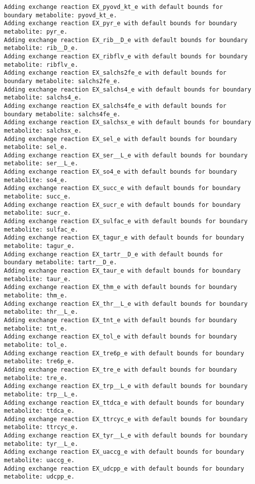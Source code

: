 \documentclass[
  letterpaper,
  DIV=11,
  numbers=noendperiod]{scrartcl}
\begin{document}
\begin{verbatim}
Adding exchange reaction EX_pyovd_kt_e with default bounds for boundary metabolite: pyovd_kt_e.
Adding exchange reaction EX_pyr_e with default bounds for boundary metabolite: pyr_e.
Adding exchange reaction EX_rib__D_e with default bounds for boundary metabolite: rib__D_e.
Adding exchange reaction EX_ribflv_e with default bounds for boundary metabolite: ribflv_e.
Adding exchange reaction EX_salchs2fe_e with default bounds for boundary metabolite: salchs2fe_e.
Adding exchange reaction EX_salchs4_e with default bounds for boundary metabolite: salchs4_e.
Adding exchange reaction EX_salchs4fe_e with default bounds for boundary metabolite: salchs4fe_e.
Adding exchange reaction EX_salchsx_e with default bounds for boundary metabolite: salchsx_e.
Adding exchange reaction EX_sel_e with default bounds for boundary metabolite: sel_e.
Adding exchange reaction EX_ser__L_e with default bounds for boundary metabolite: ser__L_e.
Adding exchange reaction EX_so4_e with default bounds for boundary metabolite: so4_e.
Adding exchange reaction EX_succ_e with default bounds for boundary metabolite: succ_e.
Adding exchange reaction EX_sucr_e with default bounds for boundary metabolite: sucr_e.
Adding exchange reaction EX_sulfac_e with default bounds for boundary metabolite: sulfac_e.
Adding exchange reaction EX_tagur_e with default bounds for boundary metabolite: tagur_e.
Adding exchange reaction EX_tartr__D_e with default bounds for boundary metabolite: tartr__D_e.
Adding exchange reaction EX_taur_e with default bounds for boundary metabolite: taur_e.
Adding exchange reaction EX_thm_e with default bounds for boundary metabolite: thm_e.
Adding exchange reaction EX_thr__L_e with default bounds for boundary metabolite: thr__L_e.
Adding exchange reaction EX_tnt_e with default bounds for boundary metabolite: tnt_e.
Adding exchange reaction EX_tol_e with default bounds for boundary metabolite: tol_e.
Adding exchange reaction EX_tre6p_e with default bounds for boundary metabolite: tre6p_e.
Adding exchange reaction EX_tre_e with default bounds for boundary metabolite: tre_e.
Adding exchange reaction EX_trp__L_e with default bounds for boundary metabolite: trp__L_e.
Adding exchange reaction EX_ttdca_e with default bounds for boundary metabolite: ttdca_e.
Adding exchange reaction EX_ttrcyc_e with default bounds for boundary metabolite: ttrcyc_e.
Adding exchange reaction EX_tyr__L_e with default bounds for boundary metabolite: tyr__L_e.
Adding exchange reaction EX_uaccg_e with default bounds for boundary metabolite: uaccg_e.
Adding exchange reaction EX_udcpp_e with default bounds for boundary metabolite: udcpp_e.

\end{verbatim}
\end{document}
